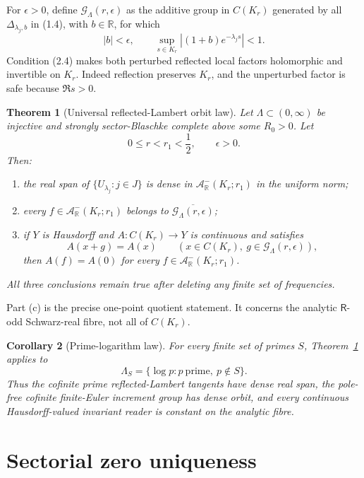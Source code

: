 \documentclass[11pt]{article}
\newtheorem{theorem}{Theorem}[section]
\newtheorem{corollary}[theorem]{Corollary}
\newcommand{\R}{\mathbb R}
\newcommand{\cA}{\mathcal A}
\newcommand{\cG}{\mathcal G}
\newcommand{\FE}{\mathsf R}
\begin{document}
For \(\epsilon>0\), define \(\cG_{\Lambda}(r,\epsilon)\) as the additive group in
\(C(K_r)\) generated by all \(\Delta_{\lambda_j,b}\) in (1.4), with
\(b\in\R\), for which
\[
 |b|<\epsilon,
 \qquad
 \sup_{s\in K_r}|(1+b)e^{-\lambda_j s}|<1.
 \tag{2.4}
\]
Condition (2.4) makes both perturbed reflected local factors holomorphic and
invertible on \(K_r\).  Indeed reflection preserves \(K_r\), and the unperturbed
factor is safe because \(\Re s>0\).

\begin{theorem}[Universal reflected-Lambert orbit law]\label{thm:main}
Let \(\Lambda\subset(0,\infty)\) be injective and strongly sector-Blaschke complete
above some \(R_0>0\).  Let
\[
 0\leq r<r_1<\frac12,\qquad \epsilon>0.
 \tag{2.5}
\]
Then:
\begin{enumerate}[label=\textup{(\alph*)}]
\item the real span of \(\{U_{\lambda_j}:j\in J\}\) is dense in
\(\cA^-_{\R}(K_r;r_1)\) in the uniform norm;
\item every \(f\in\cA^-_{\R}(K_r;r_1)\) belongs to
\(\overline{\cG_{\Lambda}(r,\epsilon)}\);
\item if \(Y\) is Hausdorff and \(A:C(K_r)\to Y\) is continuous and satisfies
\[
 A(x+g)=A(x)\qquad(x\in C(K_r),\ g\in\cG_{\Lambda}(r,\epsilon)),
 \tag{2.6}
\]
then \(A(f)=A(0)\) for every \(f\in\cA^-_{\R}(K_r;r_1)\).
\end{enumerate}
All three conclusions remain true after deleting any finite set of frequencies.
\end{theorem}

Part (c) is the precise one-point quotient statement.  It concerns the analytic
\(\FE\)-odd Schwarz-real fibre, not all of \(C(K_r)\).

\begin{corollary}[Prime-logarithm law]\label{cor:prime}
For every finite set of primes \(S\), Theorem~\ref{thm:main} applies to
\[
 \Lambda_S=\{\log p:p\ \text{prime},\ p\notin S\}.
 \tag{2.7}
\]
Thus the cofinite prime reflected-Lambert tangents have dense real span, the
pole-free cofinite finite-Euler increment group has dense orbit, and every continuous
Hausdorff-valued invariant reader is constant on the analytic fibre.
\end{corollary}

\section{Sectorial zero uniqueness}
\end{document}
